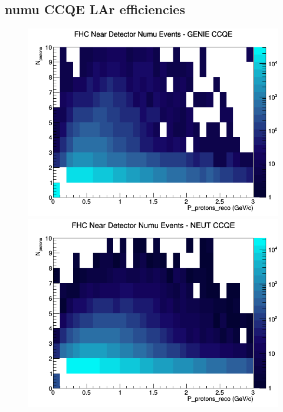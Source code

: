 \subsection{numu CCQE LAr efficiencies}
\begin{figure}[h]
\includegraphics[width=\linewidth]{eff_N_P/LAr/protons/CCQE_FHC_ND_numu_N_P_GENIE.png}
\endminipage
{}
\includegraphics[width=\linewidth]{eff_N_P/LAr/protons/CCQE_FHC_ND_numu_N_P_NEUT.png}
\endminipage
{}

\end{figure}
